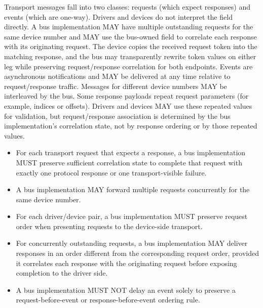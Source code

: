 Transport messages fall into two classes: requests (which expect responses) and
events (which are one-way). Drivers and devices do not interpret the
 field directly. A bus implementation MAY have multiple
outstanding requests for the same device number and MAY use the bus-owned
 field to correlate each response with its originating request.
The device copies the received request token into the matching response, and
the bus may transparently rewrite token values on either leg while preserving
request/response correlation for both endpoints.
Events are asynchronous notifications and MAY be delivered at any time
relative to request/response traffic. Messages for different device numbers MAY
be interleaved by the bus.
Some response payloads repeat request parameters (for example, indices or
offsets). Drivers and devices MAY use these repeated values for validation,
but request/response association is determined by the bus implementation's
correlation state, not by response ordering or by those repeated values.

\begin{itemize}
  \item For each transport request that expects a response, a bus
        implementation MUST preserve sufficient correlation state to complete
        that request with exactly one protocol response or one
        transport-visible failure.
  \item A bus implementation MAY forward multiple requests concurrently for the
        same device number.
  \item For each driver/device pair, a bus implementation MUST preserve request
        order when presenting requests to the device-side transport.
  \item For concurrently outstanding requests, a bus implementation MAY deliver
        responses in an order different from the corresponding request order,
        provided it correlates each response with the originating request
        before exposing completion to the driver side.
  \item A bus implementation MUST NOT delay an event solely to preserve a
        request-before-event or response-before-event ordering rule.
\end{itemize}

